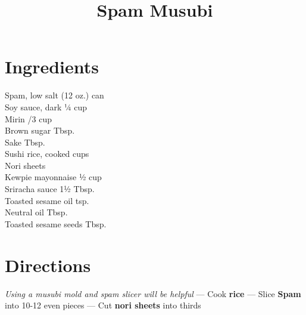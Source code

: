 \documentclass[11pt,letterpaper]{article}
\title{Spam Musubi}
\author{}
\date{}
\begin{document}
\maketitle
\thispagestyle{empty}

\section*{Ingredients}
\setlength{\columnsep}{20pt}
\begin{multicols}{2}
\noindent
    Spam, low salt  (12 oz.) can \\
    Soy sauce, dark \dotfill ¼ cup \\
    Mirin /3 cup \\
    Brown sugar  Tbsp. \\
    Sake  Tbsp. \\
    Sushi rice, cooked  cups \\
    Nori sheets  \\
    Kewpie mayonnaise \dotfill ½ cup \\
    Sriracha sauce \dotfill 1½ Tbsp. \\
    Toasted sesame oil  tsp. \\
    Neutral oil  Tbsp. \\
    Toasted sesame seeds  Tbsp.
\end{multicols}

\section*{Directions}

\noindent
\textit{Using a musubi mold and spam slicer will be helpful} ---
Cook \textbf{rice} ---
Slice \textbf{Spam} into 10-12 even pieces ---
Cut \textbf{nori sheets} into thirds
\end{document}
